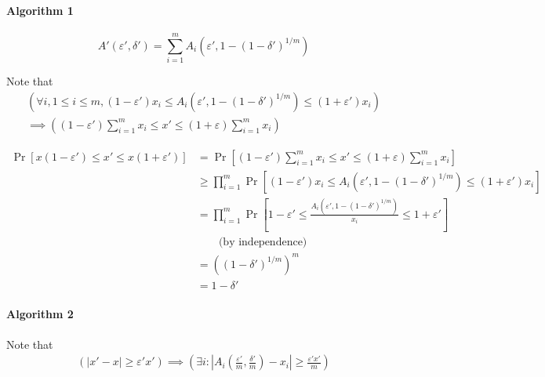 \documentclass[11pt]{article} %
\begin{document}
\paragraph{Algorithm 1}
 
\[A'(\varepsilon', \delta') = \sum_{i=1}^m A_i (\varepsilon',1-(1-\delta')^{1/m})\]

Note that 
\begin{equation}
\begin{aligned}
\left(\forall i, 1\leq i \leq m, (1-\varepsilon')x_i 
\leq A_i(\varepsilon', 1-(1-\delta')^{1/m}) \leq (1+\varepsilon') x_i\right)\\
\implies
\left((1-\varepsilon')\sum_{i=1}^m x_i \leq x' \leq (1+\varepsilon)\sum_{i=1}^m x_i\right)
\end{aligned}
\end{equation}


\begin{equation}
\begin{aligned}
    \Pr \left[x(1-\varepsilon') \leq x' \leq x(1+\varepsilon')\right]
    &= \Pr \left[(1-\varepsilon')\sum_{i=1}^m x_i \leq x' \leq (1+\varepsilon)\sum_{i=1}^m x_i\right] \\
    &\geq \prod_{i=1}^m \Pr \left[(1-\varepsilon')x_i 
    \leq A_i(\varepsilon', 1-(1-\delta')^{1/m}) \leq (1+\varepsilon') x_i\right] \\
    &= \prod_{i=1}^m \Pr \left[1-\varepsilon' 
    \leq \frac{A_i(\varepsilon', 1-(1-\delta')^{1/m})}{x_i} \leq 1+\varepsilon'\right]\\
    &\quad\quad\text{(by independence)}\\
    &= \left((1-\delta')^{1/m}\right)^m\\
    &= 1-\delta'
\end{aligned}
\end{equation}

\clearpage
\paragraph{Algorithm 2}

Note that 
\begin{equation}
\begin{aligned}
\left(|x'-x|\geq \varepsilon'x'\right) \implies
\left(\exists i : \left|A_i\left(\frac{\varepsilon'}{m},\frac{\delta'}{m}\right)
-x_i\right|\geq\frac{\varepsilon'x'}{m}\right)
\end{aligned}
\end{equation}
\end{document}
